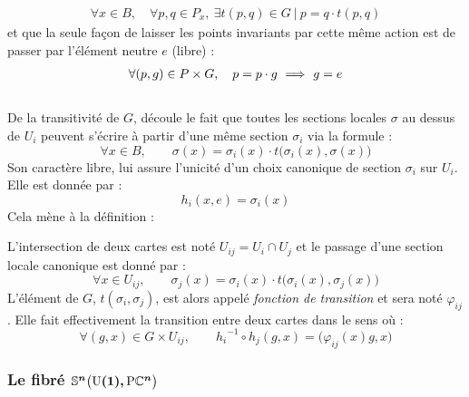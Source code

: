 \begin{align*}
	\forall x\in B,\quad \forall p,q\in P_x,\ \exists t(p,q)\in G\ |\ p = q\cdot t(p,q) 
\end{align*}
et que la seule façon de laisser les points invariants par cette même action est de passer par l'élément neutre $e$ (libre) :
\begin{align*}
	\forall (p,g)\in P\times G,\quad p = p\cdot g\ \Longrightarrow\ g=e
\end{align*}
\\
De la transitivité de $G$, découle le fait que toutes les sections locales $\sigma$ au dessus de $U_i$ peuvent s'écrire à partir d'une même section $\sigma_i$ via la formule :
\[\forall x\in B,\qquad \sigma(x) = \sigma_i(x) \cdot t\big(\sigma_i(x), \sigma(x)\big)\]
Son caractère libre, lui assure l'unicité d'un choix canonique de section $\sigma_i$ sur $U_i$. Elle est donnée par :
\[{h_i}(x,e) = \sigma_i(x)\]
Cela mène à la définition :
\begin{definition}
	L'intersection de deux cartes est noté $U_{ij} = U_i\cap U_j$ et le passage d'une section locale canonique est donné par :
	\[\forall x\in U_{ij},\qquad \sigma_j(x) = \sigma_i(x) \cdot t\big(\sigma_i(x), \sigma_j(x)\big)\]
	L'élément de $G$, $t(\sigma_i, \sigma_j)$, est alors appelé \emph{fonction de transition} et sera noté $\varphi_{ij}$. Elle fait effectivement la transition entre deux cartes dans le sens où :
	\[\forall (g,x)\in G\times U_{ij},\qquad {h_i}^{-1} \circ h_j(g,x) = \big( \varphi_{ij}(x)g, x \big)\]
\end{definition}
\skipl




\subsubsection{Le fibré $\boldsymbol{\mathbb{ S}^{n}\big(\text{\normalfont U}(1),\text{\normalfont P}\mathbb{C}^{n}\big)}$}\label{subsec:SUPC_VFP}

